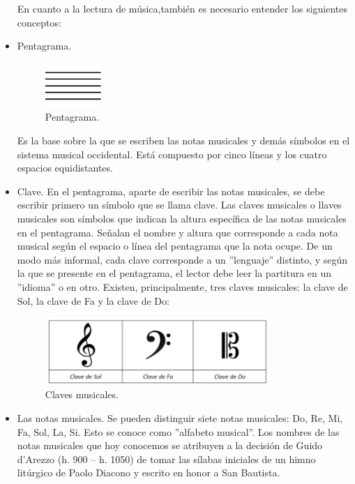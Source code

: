 \documentclass[a4paper, openright, 11pt, titlepage]{report}
\theoremstyle{definition}\newtheorem{defin}[propo]{Definition}
\theoremstyle{definition}\newtheorem{obser}[propo]{Remark}
\theoremstyle{definition}\newtheorem{ejem}[propo]{Ejemplo}
\theoremstyle{definition}\newtheorem{algoritmo}[propo]{Algoritmo}
\begin{document}
\begin{itemize}
    En cuanto a la lectura de música,también es necesario entender los siguientes conceptos:
    \item Pentagrama. 
   \begin{figure}[H]
        \begin{center}
            \includegraphics[width=0.2\textwidth]{penta.png}
        \end{center}
        \caption{Pentagrama.}
    \end{figure}
    Es la base sobre la que se escriben las notas musicales y demás símbolos en el sistema musical occidental. Está compuesto por cinco líneas y los cuatro espacios equidistantes.
    \item Clave. En el pentagrama, aparte de escribir las notas musicales, se debe escribir primero un símbolo que se llama clave.
    Las claves musicales o llaves musicales son símbolos que indican la altura específica de las notas musicales en el pentagrama. Señalan el nombre y altura que corresponde a cada nota musical según el espacio o línea del pentagrama que la nota ocupe. De un modo más informal, cada clave corresponde a un ''lenguaje'' distinto, y según la que se presente en el pentagrama, el lector debe leer la partitura en un ''idioma'' o en otro. Existen, principalmente, tres claves musicales: la clave de Sol, la clave de Fa y la clave de Do:
    \begin{figure}[H]
        \centering
        \includegraphics[width = 0.8\textwidth]{claves.png}
        \caption{Claves musicales.}
    \end{figure}
    \item Las notas musicales. Se pueden distinguir siete notas musicales: Do, Re, Mi, Fa, Sol, La, Si. Esto se conoce como ''alfabeto musical''. Los nombres de las notas musicales que hoy conocemos se atribuyen a la decisión de Guido d’Arezzo (h. 900 – h. 1050) de tomar las sílabas iniciales de un himno litúrgico de Paolo Diacono y escrito en honor a San Bautista. \cite{alfabeto}

\end{itemize}
\end{document}

